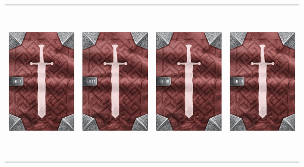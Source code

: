 \documentclass{minimal}
\begin{document}
{\begin{longtable}{llll}
\includegraphics[width=44mm,height=68mm]{./29-35/gh-031-hawk-helm-back.png} &
\includegraphics[width=44mm,height=68mm]{./29-35/gh-031-hawk-helm-back.png} &
\includegraphics[width=44mm,height=68mm]{./29-35/gh-030-studded-leather-back.png} &
\includegraphics[width=44mm,height=68mm]{./29-35/gh-030-studded-leather-back.png}\\ 

\end{longtable}}
\end{document}
